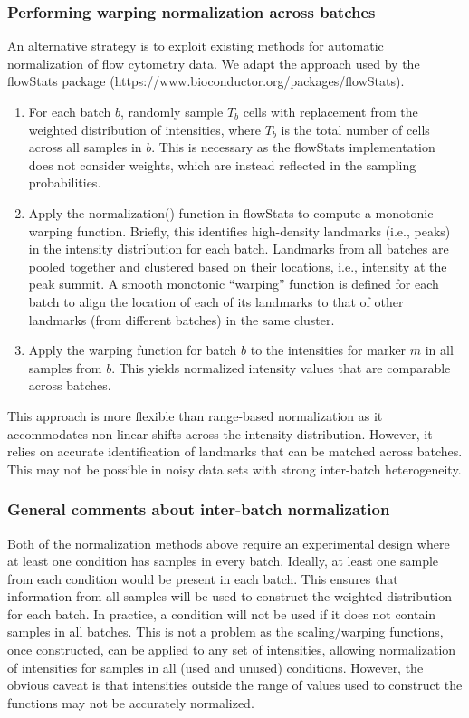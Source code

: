 \documentclass{article}
\begin{document}
\subsubsection{Performing warping normalization across batches}
An alternative strategy is to exploit existing methods for automatic normalization of flow cytometry data.
We adapt the approach used by the flowStats package (https://www.bioconductor.org/packages/flowStats).
\begin{enumerate}
    \item For each batch $b$, randomly sample $T_b$ cells with replacement from the weighted distribution of intensities,
        where $T_b$ is the total number of cells across all samples in $b$.
        This is necessary as the flowStats implementation does not consider weights, which are instead reflected in the sampling probabilities.
    \item Apply the normalization() function in flowStats to compute a monotonic warping function.
        Briefly, this identifies high-density landmarks (i.e., peaks) in the intensity distribution for each batch.
        Landmarks from all batches are pooled together and clustered based on their locations, i.e., intensity at the peak summit.
        A smooth monotonic ``warping'' function \cite{ramsay2002applied} is defined for each batch to align the location of each of its landmarks to that of other landmarks (from different batches) in the same cluster.
    \item Apply the warping function for batch $b$ to the intensities for marker $m$ in all samples from $b$.
        This yields normalized intensity values that are comparable across batches.
\end{enumerate}
This approach is more flexible than range-based normalization as it accommodates non-linear shifts across the intensity distribution.
However, it relies on accurate identification of landmarks that can be matched across batches.
This may not be possible in noisy data sets with strong inter-batch heterogeneity.

\subsubsection{General comments about inter-batch normalization}
Both of the normalization methods above require an experimental design where at least one condition has samples in every batch.
Ideally, at least one sample from each condition would be present in each batch.
This ensures that information from all samples will be used to construct the weighted distribution for each batch.
In practice, a condition will not be used if it does not contain samples in all batches.
This is not a problem as the scaling/warping functions, once constructed, can be applied to any set of intensities, allowing normalization of intensities for samples in all (used and unused) conditions.
However, the obvious caveat is that intensities outside the range of values used to construct the functions may not be accurately normalized.
\end{document}
